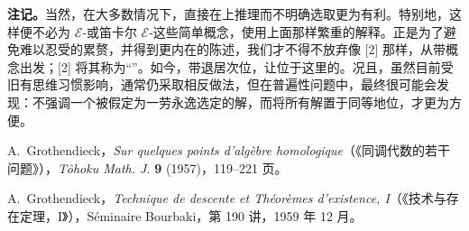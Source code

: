 \textbf{注记。}当然，在大多数情况下，直接在上推理而不明确选取更为有利。特别地，这样便不必为 $\mathcal E$-或笛卡尔 $\mathcal E$-这些简单概念，使用上面那样繁重的解释。正是为了避免难以忍受的累赘，并得到更内在的陈述，我们才不得不放弃像 [2] 那样，从带概念出发；[2] 将其称为“”。如今，带退居次位，让位于这里的。况且，虽然目前受旧有思维习惯影响，通常仍采取相反做法，但在普遍性问题中，最终很可能会发现：不强调一个被假定为一劳永逸选定的解，而将所有解置于同等地位，才更为方便。

\noindent [1] A.~Grothendieck，\textit{Sur quelques points d'algèbre homologique}（《同调代数的若干问题》），\textit{Tôhoku Math. J.} \textbf{9} (1957)，119--221 页。

\noindent [2] A.~Grothendieck，\textit{Technique de descente et Théorèmes d'existence, I}（《技术与存在定理，I》），Séminaire Bourbaki，第 190 讲，1959 年 12 月。

